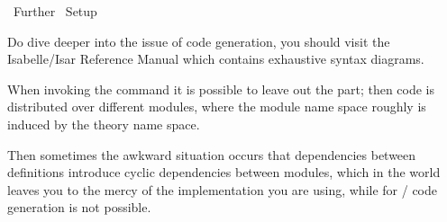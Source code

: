 %
\begin{isabellebody}%
\def\isabellecontext{Further}%
%
\isadelimtheory
%
\endisadelimtheory
%
\isatagtheory
{}\isamarkupfalse%
\ Further\isanewline
{}\ Setup\isanewline
{}%
\endisatagtheory
{\isafoldtheory}%
%
\isadelimtheory
%
\endisadelimtheory
%
\isamarkuptrue%
%
\isamarkuptrue%
%
\begin{isamarkuptext}%
Do dive deeper into the issue of code generation, you should visit
  the Isabelle/Isar Reference Manual \cite{isabelle-isar-ref} which
  contains exhaustive syntax diagrams.%
\end{isamarkuptext}%
\isamarkuptrue%
%
\isamarkuptrue%
%
\begin{isamarkuptext}%
When invoking the \hyperlink{command.export-code}{\mbox{}} command it is possible to leave
  out the \hyperlink{keyword.module-name}{\mbox{}} part;  then code is distributed over
  different modules, where the module name space roughly is induced
  by the  theory name space.

  Then sometimes the awkward situation occurs that dependencies between
  definitions introduce cyclic dependencies between modules, which in the
   world leaves you to the mercy of the  implementation
  you are using,  while for / code generation is not possible.


\end{isamarkuptext}
\end{isabellebody}
